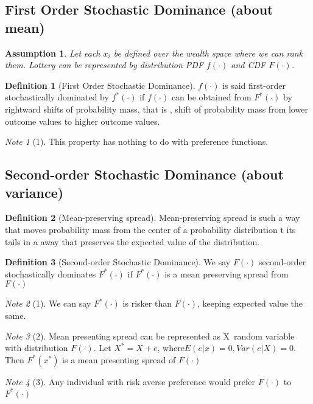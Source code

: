 \documentclass{book}
\theoremstyle{plain}
\newtheorem{asm}{Assumption}[section]
\theoremstyle{definition}
\newtheorem{defn}{Definition}[section]
\theoremstyle{remark}
\newtheorem*{note}{Note}
\begin{document}
\subsection{First Order Stochastic Dominance (about mean)}
\begin{asm}
Let each $x_i$ be defined over the wealth space where we can rank them. Lottery can be represented by distribution PDF $f(\cdot)$ and CDF $F(\cdot)$.
\end{asm}
\begin{defn}[First Order Stochastic Dominance]
$f(\cdot)$ is said first-order stochastically dominated by  $f^{*}(\cdot)$ if $f(\cdot)$ can be obtained from $F^{*}(\cdot)$ by rightward shifts of probability mass, that is , shift of probability mass from lower outcome values to higher outcome values.
\end{defn}
\begin{note}[1]
This property has nothing to do with preference functions.
\end{note}
\subsection{Second-order Stochastic Dominance (about variance)}
\begin{defn}[Mean-preserving spread]
Mean-preserving spread is such a way that moves probability mass from the center of a probability distribution t its tails in a away that preserves the expected value of the distribution.
\end{defn}

\begin{defn}[Second-order Stochastic Dominance]
We say $F(\cdot)$ second-order stochastically dominates $F^{*}(\cdot)$ if $F^{*}(\cdot)$  is a mean preserving spread from $F(\cdot)$
\end{defn}
\begin{note}[1]
We can say $F^{*}(\cdot)$ is risker than $F(\cdot)$, keeping expected value the same.
\end{note}
\begin{note}[2]
Mean presenting spread can be represented as X~random variable with distribution $F(\cdot)$. Let $X^{*} = X+ e$, where$E(e|x)=0, Var(e|X)=0$. Then $F^{*}(x^{*})$ is a mean presenting spread of $F(\cdot)$
\end{note}
\begin{note}[3]
Any individual with risk averse preference would prefer $F(\cdot)$ to $F^{*}(\cdot)$
\end{note}
\end{document}
